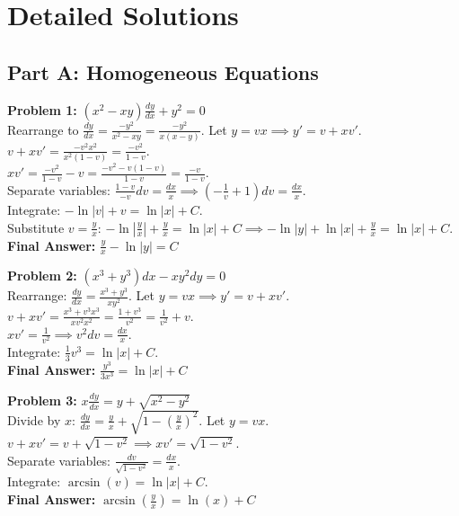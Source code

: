 \documentclass[12pt]{article}
\begin{document}
\newpage

\section{Detailed Solutions}

\subsection*{Part A: Homogeneous Equations}

\textbf{Problem 1:} $(x^2 - xy)\frac{dy}{dx} + y^2 = 0$ \\
Rearrange to $\frac{dy}{dx} = \frac{-y^2}{x^2-xy} = \frac{-y^2}{x(x-y)}$. Let $y=vx \implies y' = v+xv'$. \\
$v + xv' = \frac{-v^2x^2}{x^2(1-v)} = \frac{-v^2}{1-v}$. \\
$xv' = \frac{-v^2}{1-v} - v = \frac{-v^2 - v(1-v)}{1-v} = \frac{-v}{1-v}$. \\
Separate variables: $\frac{1-v}{-v} dv = \frac{dx}{x} \implies (-\frac{1}{v} + 1)dv = \frac{dx}{x}$. \\
Integrate: $-\ln|v| + v = \ln|x| + C$. \\
Substitute $v = \frac{y}{x}$: $-\ln\left|\frac{y}{x}\right| + \frac{y}{x} = \ln|x| + C \implies -\ln|y| + \ln|x| + \frac{y}{x} = \ln|x| + C$. \\
\textbf{Final Answer:} $\frac{y}{x} - \ln|y| = C$

\vspace{10pt}
\textbf{Problem 2:} $(x^3 + y^3)dx - xy^2 dy = 0$ \\
Rearrange: $\frac{dy}{dx} = \frac{x^3+y^3}{xy^2}$. Let $y=vx \implies y' = v+xv'$. \\
$v + xv' = \frac{x^3 + v^3x^3}{xv^2x^2} = \frac{1+v^3}{v^2} = \frac{1}{v^2} + v$. \\
$xv' = \frac{1}{v^2} \implies v^2 dv = \frac{dx}{x}$. \\
Integrate: $\frac{1}{3}v^3 = \ln|x| + C$. \\
\textbf{Final Answer:} $\frac{y^3}{3x^3} = \ln|x| + C$

\vspace{10pt}
\textbf{Problem 3:} $x \frac{dy}{dx} = y + \sqrt{x^2 - y^2}$ \\
Divide by $x$: $\frac{dy}{dx} = \frac{y}{x} + \sqrt{1 - \left(\frac{y}{x}\right)^2}$. Let $y=vx$. \\
$v + xv' = v + \sqrt{1-v^2} \implies xv' = \sqrt{1-v^2}$. \\
Separate variables: $\frac{dv}{\sqrt{1-v^2}} = \frac{dx}{x}$. \\
Integrate: $\arcsin(v) = \ln|x| + C$. \\
\textbf{Final Answer:} $\arcsin\left(\frac{y}{x}\right) = \ln(x) + C$
\end{document}
